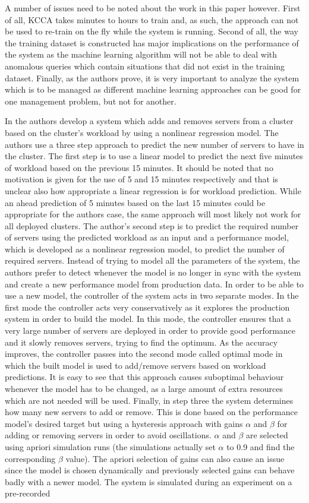 A number of issues need to be noted about the work in this paper however. First of all, KCCA takes minutes to hours to train and, as such, the approach can not be used to re-train on the fly while the system is running. Second of all, the way the training dataset is constructed has major implications on the performance of the system as the machine learning algorithm will not be able to deal with anomalous queries which contain situations that did not exist in the training dataset. Finally, as the authors prove, it is very important to analyze the system which is to be managed as different machine learning approaches can be good for one management problem, but not for another.

In \cite{related:mlac} the authors develop a system which adds and removes servers from a cluster based on the cluster's workload by using a nonlinear regression model. The authors use a three step approach to predict the new number of servers to have in the cluster. The first step is to use a linear model to predict the next five minutes of workload based on the previous 15 minutes. It should be noted that no motivation is given for the use of 5 and 15 minutes respectively and that is unclear also how appropriate a linear regression is for workload prediction. While an ahead prediction of 5 minutes based on the last 15 minutes could be appropriate for the authors case, the same approach will most likely not work for all deployed clusters. The author's second step is to predict the required number of servers using the predicted workload as an input and a performance model, which is developed as a nonlinear regression model, to predict the number of required servers. Instead of trying to model all the parameters of the system, the authors prefer to detect whenever the model is no longer in sync with the system and create a new performance model from production data. In order to be able to use a new model, the controller of the system acts in two separate modes. In the first mode the controller acts very conservatively as it explores the production system in order to build the model. In this mode, the controller ensures that a very large number of servers are deployed in order to provide good performance and it slowly removes servers, trying to find the optimum. As the accuracy improves, the controller passes into the second mode called optimal mode in which the built model is used to add/remove servers based on workload predictions. It is easy to see that this approach causes suboptimal behaviour whenever the model has to be changed, as a large amount of extra resources which are not needed will be used. Finally, in step three the system determines how many new servers to add or remove. This is done based on the performance model's desired target but using a hysteresis approach with gains $\alpha$ and $\beta$ for adding or removing servers in order to avoid oscillations. $\alpha$ and $\beta$ are selected using apriori simulation runs (the simulations actually set $\alpha$ to 0.9 and find the corresponding $\beta$ value). The apriori selection of gains can also cause an issue since the model is chosen dynamically and previously selected gains can behave badly with a newer model. The system is simulated during an experiment on a pre-recorded 